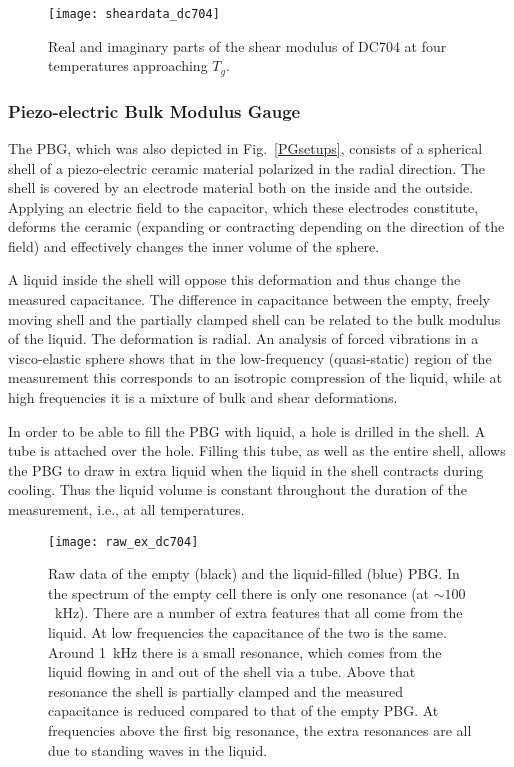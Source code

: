 \documentclass[reprint,showpacs,amsmath,amssymb,aip,jcp]{revtex4-1}
\begin{document}
\begin{figure}
  \texttt{[image: sheardata\_dc704]}
  \caption{\label{sheardata}Real and imaginary parts of the shear
    modulus of DC704 at four temperatures approaching $T_g$.}
\end{figure}

\subsubsection{Piezo-electric Bulk Modulus Gauge}

The PBG, which was also depicted in Fig.\ \ref{PGsetups}, consists of a
spherical shell of a piezo-electric ceramic material polarized in the
radial direction. The shell is covered by an electrode material both
on the inside and the outside. Applying an electric field to the
capacitor, which these electrodes constitute, deforms the ceramic
(expanding or contracting depending on the direction of the field) and
effectively changes the inner volume of the sphere.

A liquid inside the shell will oppose this deformation and thus change
the measured capacitance. The difference in capacitance between the
empty, freely moving shell and the partially clamped shell can be
related to the bulk modulus of the liquid. The deformation is radial.
An analysis of forced vibrations in a visco-elastic sphere shows
that in the low-frequency (quasi-static) region of the measurement
this corresponds to an isotropic compression of the liquid, while at high
frequencies it is a mixture of bulk and shear deformations.

In order to be able to fill the PBG with liquid, a hole is drilled in
the shell. A tube is attached over the hole. Filling this tube, as
well as the entire shell, allows the PBG to draw in extra liquid when
the liquid in the shell contracts during cooling. Thus the liquid
volume is constant throughout the duration of the measurement, i.e.,
at all temperatures.

\begin{figure}
  \texttt{[image: raw\_ex\_dc704]}
  \caption{\label{raw_ex_dc704}Raw data of the empty (black) and the
    liquid-filled (blue) PBG. In the spectrum of the empty cell there
    is only one resonance (at $\sim 100$~kHz). There are a number of
    extra features that all come from the liquid. At low frequencies
    the capacitance of the two is the same. Around 1~kHz there is a
    small resonance, which comes from the liquid flowing in and out of
    the shell via a tube. Above that resonance the shell is partially
    clamped and the measured capacitance is reduced compared to that
    of the empty PBG. At frequencies above the first big resonance,
    the extra resonances are all due to standing waves in the liquid.}
\end{figure}
\end{document}
